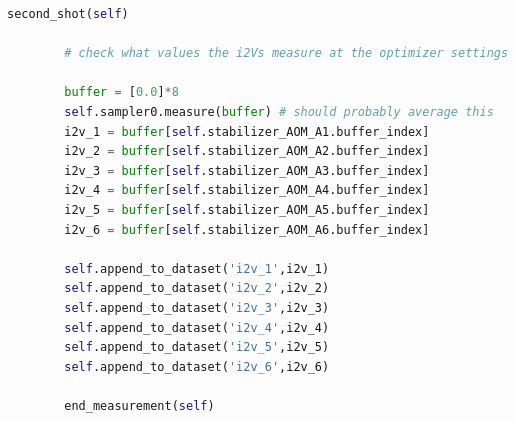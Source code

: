 \begin{lstlisting}[language=Python
]
        second_shot(self)

        # check what values the i2Vs measure at the optimizer settings for the AOM amplitudes-- we want to use these values as the new MOT beam set points once we find the best iteration from the optimization run.

        buffer = [0.0]*8
        self.sampler0.measure(buffer) # should probably average this
        i2v_1 = buffer[self.stabilizer_AOM_A1.buffer_index]
        i2v_2 = buffer[self.stabilizer_AOM_A2.buffer_index]
        i2v_3 = buffer[self.stabilizer_AOM_A3.buffer_index]
        i2v_4 = buffer[self.stabilizer_AOM_A4.buffer_index]
        i2v_5 = buffer[self.stabilizer_AOM_A5.buffer_index]
        i2v_6 = buffer[self.stabilizer_AOM_A6.buffer_index]

        self.append_to_dataset('i2v_1',i2v_1)
        self.append_to_dataset('i2v_2',i2v_2)
        self.append_to_dataset('i2v_3',i2v_3)
        self.append_to_dataset('i2v_4',i2v_4)
        self.append_to_dataset('i2v_5',i2v_5)
        self.append_to_dataset('i2v_6',i2v_6)

        end_measurement(self)

\end{lstlisting}




